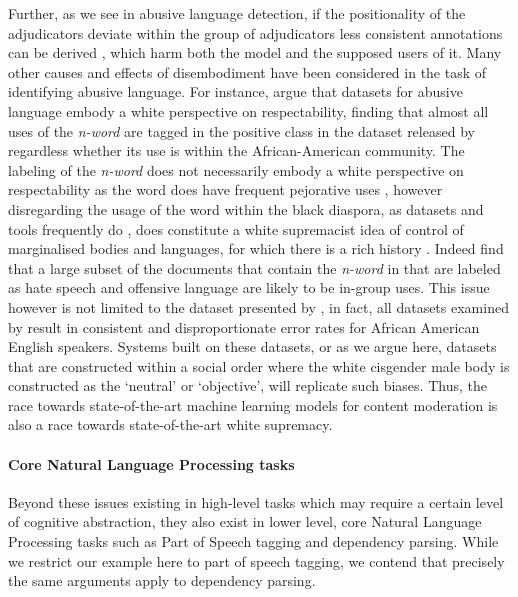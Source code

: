 Further, as we see in abusive language detection, if the positionality of the adjudicators deviate within the group of adjudicators less consistent annotations can be derived \cite{Waseem:2016}, which harm both the model and the supposed users of it. Many other causes and effects of disembodiment have been considered in the task of identifying abusive language. For instance, \citet{Waseem:2018} argue that datasets for abusive language embody a white perspective on respectability, finding that almost all uses of the \textit{n-word} are tagged in the positive class in the dataset released by \citet{Davidson:2017} regardless whether its use is within the African-American community. The labeling of the \textit{n-word} does not necessarily embody a white perspective on respectability as the word does have frequent pejorative uses \citep{Croom:2013}, however disregarding the usage of the word within the black diaspora, as datasets and tools frequently do \citep{Davidson:2019}, does constitute a white supremacist idea of control of marginalised bodies and languages, for which there is a rich history \citep{ON control and language, raciolinguistic, african american slaves and their language use}. Indeed \citet{Waseem:2018} find that a large subset of the documents that contain the \textit{n-word} in \citet{Davidson:2017} that are labeled as hate speech and offensive language are likely to be in-group uses. This issue however is not limited to the dataset presented by \citet{Davidson:2017}, in fact, all datasets examined by \citet{Davidson:2019} result in consistent and disproportionate error rates for African American English speakers. Systems built on these datasets, or as we argue here, datasets that are constructed within a social order where the white cisgender male body is constructed as the `neutral' or `objective', will replicate such biases. Thus, the race towards state-of-the-art machine learning models for content moderation is also a race towards state-of-the-art white supremacy.

\paragraph{Core Natural Language Processing tasks}
Beyond these issues existing in high-level tasks which may require a certain level of cognitive abstraction, they also exist in lower level, core Natural Language Processing tasks such as Part of Speech tagging and dependency parsing. While we restrict our example here to part of speech tagging, we contend that precisely the same arguments apply to dependency parsing.

